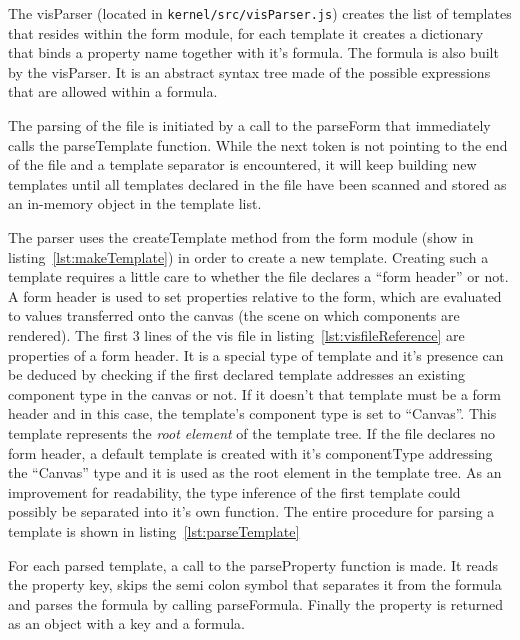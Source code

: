 The visParser (located in \texttt{kernel/src/visParser.js}) creates the list of templates that resides within the form module, for each template it creates a dictionary that binds a property name together with it's formula. The formula is also built by the visParser. It is an abstract syntax tree made of the possible expressions that are allowed within a formula.

The parsing of the file is initiated by a call to the parseForm that immediately calls the parseTemplate function. While the next token is not pointing to the end of the file and a template separator is encountered, it will keep building new templates until all templates declared in the file have been scanned and stored as an in-memory object in the template list.





The parser uses the createTemplate method from the form module (show in listing~\ref{lst:makeTemplate}) in order to create a new template. Creating such a template requires a little care to whether the file declares a ``form header'' or not. A form header is used to set properties relative to the form, which are evaluated to values transferred onto the canvas (the scene on which components are rendered). The first 3 lines of the vis file in listing~\ref{lst:visfileReference} are properties of a form header. It is a special type of template and it's presence can be deduced by checking if the first declared template addresses an existing component type in the canvas or not. If it doesn't that template must be a form header and in this case, the template's component type is set to ``Canvas''. This template represents the \emph{root element} of the template tree. If the file declares no form header, a default template is created with it's componentType addressing the ``Canvas'' type and it is used as the root element in the template tree. As an improvement for readability, the type inference of the first template could possibly be separated into it's own function. The entire procedure for parsing a template is shown in listing~\ref{lst:parseTemplate}

For each parsed template, a call to the parseProperty function is made. It reads the property key, skips the semi colon symbol that separates it from the formula and parses the formula by calling parseFormula. Finally the property is returned as an object with a key and a formula.

